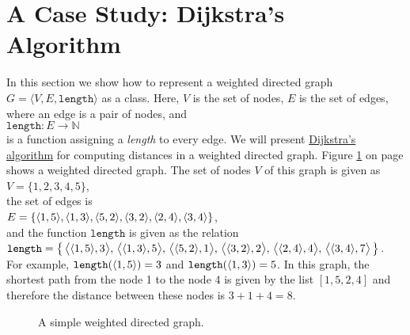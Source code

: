 \section{A Case Study: Dijkstra's Algorithm}
In this section we show how to represent a weighted
directed graph $G = \langle V, E, \mathtt{length} \rangle$ as a class.  Here, $V$ is the
set of nodes, $E$ is the set of edges, where an edge is a pair of nodes, and 
\\[0.2cm]
\hspace*{1.3cm}
$\texttt{length}: E \rightarrow \mathbb{N}$
\\[0.2cm]
is a function assigning a \emph{length} to every edge.  We will present 
\href{http://en.wikipedia.org/wiki/Dijkstra%27s_algorithm}{Dijkstra's algorithm} 
for computing distances in a weighted directed graph.
Figure \ref{fig:graph.eps} on page \pageref{fig:graph.eps} shows a weighted directed graph.  The set
of nodes $V$ of this graph is given as 
\\[0.2cm]
\hspace*{1.3cm}
$V = \{1,2,3,4,5\}$,
\\[0.2cm] 
the set of edges is 
\\[0.2cm]
\hspace*{1.3cm}
$E = \{ \pair(1,5), \pair(1,3), \pair(5,2), \pair(3,2), \pair(2,4), \pair(3,4) \}$,
\\[0.2cm]
and the function $\mathtt{length}$ is given as the relation
\\[0.2cm]
\hspace*{1.3cm}
$\mathtt{length} = \bigl\{\, \bigl\langle\pair(1,5), 3 \bigr\rangle,\,
                             \bigl\langle\pair(1,3), 5 \bigr\rangle,\,
                             \bigl\langle\pair(5,2), 1 \bigr\rangle,\,
                             \bigl\langle\pair(3,2), 2 \bigr\rangle,\,
                             \bigl\langle\pair(2,4), 4 \bigr\rangle,\,
                             \bigl\langle\pair(3,4), 7 \bigr\rangle\,
                   \bigr\}$.
\\[0.2cm]
For example, $\mathtt{length}(\pair(1,5)) = 3$ and $\mathtt{length}(\pair(1,3)) = 5$.
In this graph, the shortest path from the node 1 to the node 4 is
given by the list $[1,5,2,4]$ and therefore the distance between these
nodes is $3 + 1 + 4 = 8$.

\begin{figure}[!ht]
  \centering
  \caption{A simple weighted directed graph.}
  \label{fig:graph.eps}
\end{figure}


